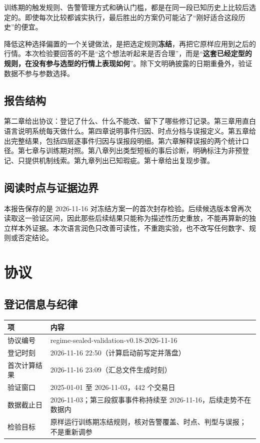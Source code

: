\documentclass[12pt,a4paper]{ctexart}
\begin{document}
训练期的触发规则、告警管理方式和确认门槛，都是在同一段已知历史上比较后选定的。即使每次比较都诚实执行，最后胜出的方案仍可能沾了“刚好适合这段历史”的便宜。

降低这种选择偏置的一个关键做法，是把选定规则\textbf{冻结}，再把它原样应用到之后的行情。本次检验要回答的不是“这个想法听起来是否合理”，而是“\textbf{这套已经定型的规则，在没有参与选型的行情上表现如何}”。除下文明确披露的日期重叠外，验证数据不参与参数选择。

\subsection{报告结构}

第二章给出协议：登记了什么、什么不能改、留下了哪些修订记录。第三章用直白语言说明系统每天做什么。第四章说明事件归因、时点分档与误报定义。第五章给出完整结果，包括四层逐事件归因与误报段明细。第六章解释误报的两个统计口径。第七章与训练期对照。第八章列出类型短板的事后诊断，明确标注为非预登记、只提供机制线索。第九章列出已知瑕疵。第十章给出复现步骤。

\subsection{阅读时点与证据边界}

本报告保存的是 2026-11-16 对冻结方案一的首次封存检验。后续候选版本曾再次读取这一验证区间，因此那些后续结果只能称为描述性历史重放，不能再算新的独立样本外证据。本次语言润色只改善可读性，不重跑实验，也不改写任何数字、规则或否定结论。

\section{协议}

\subsection{登记信息与纪律}

\begin{center}\small
\begin{tabularx}{\textwidth}{@{}>{\raggedright\arraybackslash}p{3.4cm}Y@{}}
\toprule
\textbf{项} & \textbf{内容} \\
\midrule
协议编号 & regime-sealed-validation-v0.18-2026-11-16 \\
登记时刻 & 2026-11-16 22:50（计算启动前写定并落盘）\\
首次计算结果 & 2026-11-16 23:09（汇总文件生成时刻）\\
验证窗口 & 2025-01-01 至 2026-11-03，442 个交易日 \\
数据截止日 & 2026-11-03；第三段叙事事件称持续至 2026-11-16，后续走势不在数据内 \\
检验目标 & 原样运行训练期冻结规则，核对告警覆盖、时点、判型与误报；不是重新调参 \\
\bottomrule
\end{tabularx}
\end{center}
\end{document}
